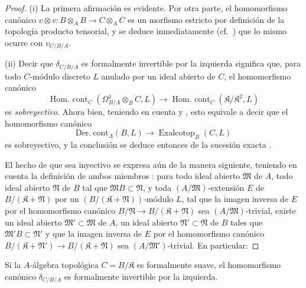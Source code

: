 \begin{proof}
(i) La primera afirmación es evidente. Por otra parte, el homomorfismo
canónico $v\otimes v:B\otimes_A B\to C\otimes_A C$ es un morfismo estricto
por definición de la topología producto tensorial, y se deduce inmediatamente
(cf.\ ) que lo mismo ocurre con $v_{C/B/A}$.

(ii) Decir que $\delta_{C/B/A}$ es formalmente invertible por la izquierda significa
que, para todo $C$-módulo discreto $L$ anulado por un ideal abierto de $C$,
el homomorfismo canónico
\[
  \operatorname{Hom.\ cont}_C(\Omega^1_{B/A}\otimes_B C,L)\to
  \operatorname{Hom.\ cont}_C(\mathfrak{K}/\mathfrak{K}^2,L)
\]
es \emph{sobreyectivo}. Ahora bien, teniendo en cuenta  y
, esto equivale a decir que el homomorfismo canónico
\[
  \operatorname{D\acute{e}r.\ cont}_A(B,L)\to
  \operatorname{Exalcotop}_B(C,L)
\]
es sobreyectivo, y la conclusión se deduce entonces de la sucesión exacta
.

El hecho de que  sea inyectivo se expresa aún de la manera
siguiente, teniendo en cuenta la definición de ambos miembros
: para todo ideal abierto $\mathfrak{M}$ de $A$, todo ideal
abierto $\mathfrak{N}$ de $B$ tal que $\mathfrak{M}B\subset\mathfrak{N}$, y
toda $(A/\mathfrak{M})$-extensión $E$ de
$B/(\mathfrak{K}+\mathfrak{N})$ por un
$(B/(\mathfrak{K}+\mathfrak{N}))$-módulo $L$, tal que la imagen inversa de
$E$ por el homomorfismo canónico
$B/\mathfrak{N}\to B/(\mathfrak{K}+\mathfrak{N})$ sea
$(A/\mathfrak{M})$-trivial, existe un ideal abierto
$\mathfrak{M}'\subset\mathfrak{M}$ de $A$,
un ideal abierto $\mathfrak{N}'\subset\mathfrak{N}$ de $B$ tales que
$\mathfrak{M}'B\subset\mathfrak{N}'$ y que la imagen inversa de $E$ por
el homomorfismo canónico
$B/(\mathfrak{K}+\mathfrak{N}')\to B/(\mathfrak{K}+\mathfrak{N})$ sea
$(A/\mathfrak{M}')$-trivial. En particular:
\end{proof}

\begin{corollary}[20.7.9]
\label{0.20.7.9-fr}
Si la $A$-álgebra topológica $C=B/\mathfrak{K}$ es formalmente suave,
el homomorfismo canónico $\delta_{C/B/A}$ es formalmente invertible por la
izquierda.
\end{corollary}

